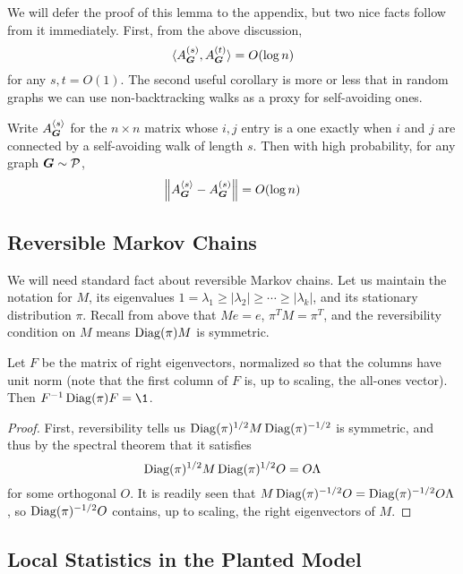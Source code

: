 We will defer the proof of this lemma to the appendix, but two nice facts follow from it immediately. First, from the above discussion,
$$
    \langle A^{(s)}_{\boldsymbol{G}},A^{(t)}_{\boldsymbol{G}} \rangle = O(\log n)
$$
for any $s,t=O(1)$. The second useful corollary is more or less that in random graphs we can use non-backtracking walks as a proxy for self-avoiding ones.

\begin{lemma}
    Write $A^{\langle s \rangle}_{\boldsymbol{G}}$ for the $n\times n$ matrix whose $i,j$ entry is a one exactly when $i$ and $j$ are connected by a self-avoiding walk of length $s$. Then with high probability, for any graph $\boldsymbol{G} \sim \mathcal{P}$,
    \begin{equation}
        \left\| A^{\langle s \rangle}_{\boldsymbol{G}} - A^{(s)}_{\boldsymbol{G}} \right\| = O(\log n)
    \end{equation}
\end{lemma}

\subsection{Reversible Markov Chains}

We will need standard fact about reversible Markov chains. Let us maintain the notation for $M$, its eigenvalues $1 = \lambda_1 \ge |\lambda_2| \ge \cdots \ge |\lambda_k|$, and its stationary distribution $\pi$. Recall from above that $Me = e$, $\pi^T M = \pi^T$, and the reversibility condition on $M$ means $\operatorname{Diag}(\pi)M$ is symmetric. 

\begin{lemma}
    Let $F$ be the matrix of right eigenvectors, normalized so that the columns have unit norm (note that the first column of $F$ is, up to scaling, the all-ones vector). Then $F^{-1}\Diag(\pi) F = \1$.
\end{lemma}

\begin{proof}
    First, reversibility tells us $\operatorname{Diag}(\pi)^{1/2}M\operatorname{Diag}(\pi)^{-1/2}$ is symmetric, and thus by the spectral theorem that it satisfies 
    $$
        \operatorname{Diag}(\pi)^{1/2}M\operatorname{Diag}(\pi)^{1/2}O = O\Lambda
    $$ 
    for some orthogonal $O$. It is readily seen that $M\operatorname{Diag}(\pi)^{-1/2}O = \operatorname{Diag}(\pi)^{-1/2}O\Lambda$, so $\operatorname{Diag}(\pi)^{-1/2}O$ contains, up to scaling, the right eigenvectors of $M$.
\end{proof}

\subsection{Local Statistics in the Planted Model} %
\label{sub:local_statistics_in_the_planted_model}

